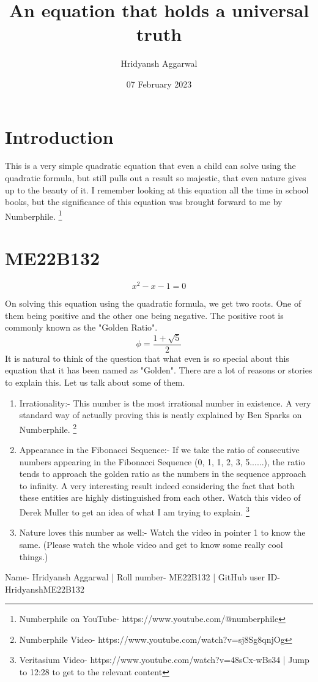 \title{An equation that holds a universal truth}
\author{Hridyansh Aggarwal}
\date{07 February 2023}



\maketitle

\section{Introduction}

This is a very simple quadratic equation that even a child can solve using the quadratic formula, but still pulls out a result so majestic, that even nature gives up to the beauty of it. I remember looking at this equation all the time in school books, but the significance of this equation was brought forward to me by Numberphile. \footnote{Numberphile on YouTube- https://www.youtube.com/@numberphile}

\section{ME22B132}

\begin{equation}
    x^2-x-1=0
\end{equation}

On solving this equation using the quadratic formula, we get two roots. One of them being positive and the other one being negative. The positive root is commonly known as the "Golden Ratio".
\begin{equation}
    \phi = \frac{1+\sqrt{5}}{2}
\end{equation}
It is natural to think of the question that what even is so special about this equation that it has been named as "Golden".
There are a lot of reasons or stories to explain this. Let us talk about some of them.
\begin{enumerate}
    \item Irrationality:- This number is the most irrational number in existence. A very standard way of actually proving this is neatly explained by Ben Sparks on Numberphile. \footnote{Numberphile Video- https://www.youtube.com/watch?v=sj8Sg8qnjOg}
    \item Appearance in the Fibonacci Sequence:- If we take the ratio of consecutive numbers appearing in the Fibonacci Sequence (0, 1, 1, 2, 3, 5......), the ratio tends to approach the golden ratio as the numbers in the sequence approach to infinity. A very interesting result indeed considering the fact that both these entities are highly distinguished from each other. Watch this video of Derek Muller to get an idea of what I am trying to explain. \footnote{Veritasium Video- https://www.youtube.com/watch?v=48sCx-wBs34 | Jump to 12:28 to get to the relevant content}
    \item Nature loves this number as well:- Watch the video in pointer 1 to know the same. (Please watch the whole video and get to know some really cool things.)
\end{enumerate}
Name- Hridyansh Aggarwal | Roll number- ME22B132 | GitHub user ID- HridyanshME22B132
